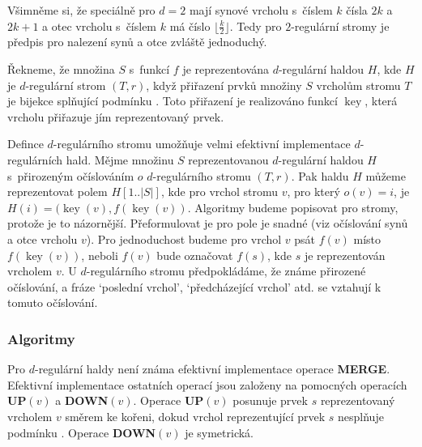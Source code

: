 \documentclass[a4paper,12pt]{article}
\DeclareMathOperator*{\key}{key}
\begin{document}
Všimněme si, že speciálně pro $d=2$ mají synové vrcholu s~číslem $
k$ 
čísla $2k$ a $2k+1$ a otec vrcholu s~číslem $k$ má číslo 
$\lfloor\frac k2\rfloor$. Tedy pro $2$-regulární stromy je předpis pro nalezení 
synů a otce zvláště jednoduchý.  

Řekneme, že množina $S$ s~funkcí $f$ je reprezentována 
$d$-regulár\-ní haldou $H$, kde $H$ je $d$-regulární strom $
(T,r)$, když 
přiřazení prvků množiny $S$ vrcholům stromu 
$T$ je bijekce splňující podmínku . Toto přiřazení 
je realizováno funkcí $\key$, která vrcholu přiřazuje jím 
reprezentovaný prvek.

Defince $d$-regulárního stromu umožňuje velmi efektivní 
implementace $d$-regulárních hald.  Měj\-me množinu $
S$ 
reprezentovanou $d$-regulární haldou $H$ s~přirozeným 
očís\-lo\-vá\-ním $o$ $d$-regulární\-ho stromu $
(T,r)$.  Pak haldu $H$ 
můžeme reprezentovat polem $H[1..|S|]$, kde pro vrchol 
stromu $v$, pro který $o(v)=i$, je $H(i)=(\key(v),f(\key(v))$.  Algoritmy 
budeme popisovat pro stromy, protože je to názornější.  
Přeformulovat je pro pole je snadné (viz 
očíslování synů a otce vrcholu $v$).  Pro jednoduchost 
budeme pro vrchol $v$ psát $f(v)$ místo $f(\key(v))$, neboli $
f(v)$ 
bude označovat $f(s)$, kde $s$ je reprezentován vrcholem $v$.  U 
$d$-regulárního stromu předpo\-klá\-dáme, že známe přirozené 
očíslování, a fráze `poslední vrchol', `před\-cházející vrchol' atd.  
se vztahují k tomuto očíslování.  

\subsubsection{Algoritmy}

Pro $d$-regulární haldy není známa efektivní implementace operace 
{\bf MERGE}.  Efektivní implementace 
ostatních operací jsou založeny na pomocných 
operacích {\bf UP$(v)$} a {\bf DOWN$(v)$}.  Ope\-race {\bf UP$
(v)$} posunuje 
prvek $s$ reprezentovaný vrcholem $v$ směrem ke kořeni, 
dokud vrchol reprezentující prvek $s$ nesplňu\-je podmínku 
.  Operace {\bf DOWN$(v)$} je symetrická.  

 
\end{document}
